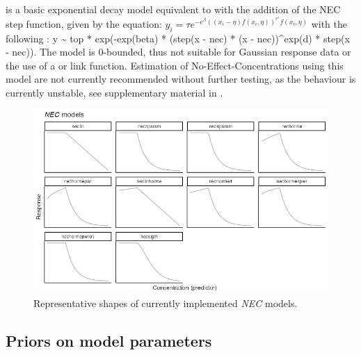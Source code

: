 \documentclass[
  shortnames]{jss}
\begin{document}
 is a basic exponential decay model equivalent to  with the addition of the NEC step function, given by the equation:
\(y_i = \tau e^{-e^{\beta} ((x_i - \eta) f(x_i, \eta))^{e^\epsilon}f(x_i, \eta)}\)
with the following : y \textasciitilde{} top * exp(-exp(beta) * (step(x - nec) * (x - nec))\^{}exp(d) * step(x - nec)). The model is 0-bounded, thus not suitable for Gaussian response data or the use of a  or  link function. Estimation of No-Effect-Concentrations using this model are not currently recommended without further testing, as the behaviour is currently unstable, see supplementary material in \citet{fisher2023ieam}.

\begin{figure}[ht]
  \centering
  \includegraphics[width=1\textwidth]{../vignettes/vignette-fig-exmp2b-theoretical_nec_curves.png}
  \caption{Representative shapes of currently implemented  \textit{NEC} models.}
  \label{fig2}
\end{figure}

\hypertarget{priors-on-model-parameters}{%
\subsection{Priors on model parameters}\label{priors-on-model-parameters}}
\end{document}
